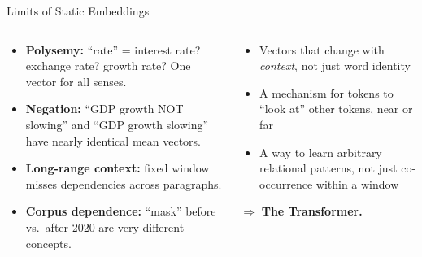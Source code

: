 \begin{frame}{Limits of Static Embeddings}
\begin{columns}[T]
\begin{tcolorbox}[colback=red!5, colframe=red!50!black, title=\textbf{What static embeddings miss}]
\begin{itemize}
\item \textbf{Polysemy:} ``rate'' = interest rate? exchange rate? growth rate? One vector for all senses.
\item \textbf{Negation:} ``GDP growth NOT slowing'' and ``GDP growth slowing'' have nearly identical mean vectors.
\item \textbf{Long-range context:} fixed window misses dependencies across paragraphs.
\item \textbf{Corpus dependence:} ``mask'' before vs.\ after 2020 are very different concepts.
\end{itemize}
\end{tcolorbox}

\begin{tcolorbox}[colback=green!5, colframe=green!40!black, title=\textbf{What we need next}]
\begin{itemize}
\item Vectors that change with \emph{context}, not just word identity
\item A mechanism for tokens to ``look at'' other tokens, near or far
\item A way to learn arbitrary relational patterns, not just co-occurrence within a window
\end{itemize}
\medskip
$\Longrightarrow$ \textbf{The Transformer.}
\end{tcolorbox}
\end{columns}
\end{frame}


